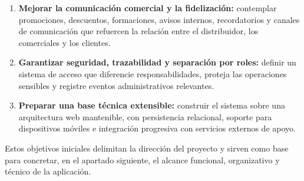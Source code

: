 \begin{enumerate}
    \item \textbf{Mejorar la comunicación comercial y la fidelización:} contemplar promociones, descuentos, formaciones, avisos internos, recordatorios y canales de comunicación que refuercen la relación entre el distribuidor, los comerciales y los clientes.

    \item \textbf{Garantizar seguridad, trazabilidad y separación por roles:} definir un sistema de acceso que diferencie responsabilidades, proteja las operaciones sensibles y registre eventos administrativos relevantes.

    \item \textbf{Preparar una base técnica extensible:} construir el sistema sobre una arquitectura web mantenible, con persistencia relacional, soporte para dispositivos móviles e integración progresiva con servicios externos de apoyo.
\end{enumerate}

Estos objetivos iniciales delimitan la dirección del proyecto y sirven como base para concretar, en el apartado siguiente, el alcance funcional, organizativo y técnico de la aplicación.
